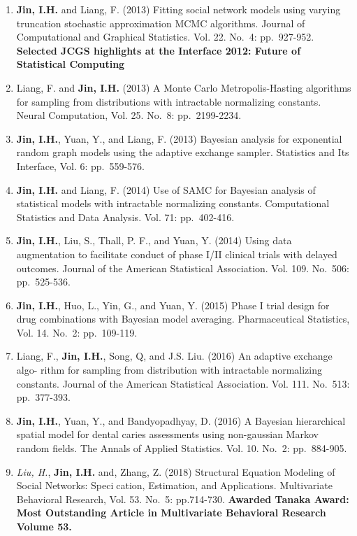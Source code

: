 \documentclass[
]{book}
\begin{document}
\begin{enumerate}
\def\labelenumi{\arabic{enumi}.}
\item
  \textbf{Jin, I.H.} and Liang, F. (2013) Fitting social network models using varying truncation stochastic approximation MCMC algorithms. Journal of Computational and Graphical Statistics. Vol. 22. No.~4: pp.~927-952. \textbf{Selected JCGS highlights at the Interface 2012: Future of Statistical Computing}
\item
  Liang, F. and \textbf{Jin, I.H.} (2013) A Monte Carlo Metropolis-Hasting algorithms for sampling from distributions with intractable normalizing constants. Neural Computation, Vol. 25. No.~8: pp.~2199-2234.
\item
  \textbf{Jin, I.H.}, Yuan, Y., and Liang, F. (2013) Bayesian analysis for exponential random graph models using the adaptive exchange sampler. Statistics and Its Interface, Vol. 6: pp.~559-576.
\item
  \textbf{Jin, I.H.} and Liang, F. (2014) Use of SAMC for Bayesian analysis of statistical models with intractable normalizing constants. Computational Statistics and Data Analysis. Vol. 71: pp.~402-416.
\item
  \textbf{Jin, I.H.}, Liu, S., Thall, P. F., and Yuan, Y. (2014) Using data augmentation to facilitate conduct of phase I/II clinical trials with delayed outcomes. Journal of the American Statistical Association. Vol. 109. No.~506: pp.~525-536.
\item
  \textbf{Jin, I.H.}, Huo, L., Yin, G., and Yuan, Y. (2015) Phase I trial design for drug combinations with Bayesian model averaging. Pharmaceutical Statistics, Vol. 14. No.~2: pp.~109-119.
\item
  Liang, F., \textbf{Jin, I.H.}, Song, Q, and J.S. Liu. (2016) An adaptive exchange algo- rithm for sampling from distribution with intractable normalizing constants. Journal of the American Statistical Association. Vol. 111. No.~513: pp.~377-393.
\item
  \textbf{Jin, I.H.}, Yuan, Y., and Bandyopadhyay, D. (2016) A Bayesian hierarchical spatial model for dental caries assessments using non-gaussian Markov random fields. The Annals of Applied Statistics. Vol. 10. No.~2: pp.~884-905.
\item
  \emph{Liu, H.}, \textbf{Jin, I.H.} and, Zhang, Z. (2018) Structural Equation Modeling of Social Networks: Specication, Estimation, and Applications. Multivariate Behavioral Research, Vol. 53. No.~5: pp.714-730. \textbf{Awarded Tanaka Award: Most Outstanding Article in Multivariate Behavioral Research Volume 53.}

\end{enumerate}
\end{document}
